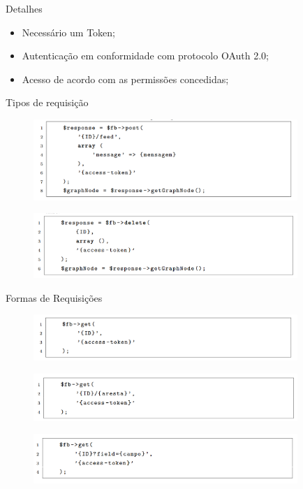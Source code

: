 \documentclass{aula-ifb}
\begin{document}
\begin{frame}{Detalhes}
\begin{itemize}
   \item Necessário um Token;
   \item Autenticação em conformidade com protocolo OAuth 2.0;
   \item Acesso de acordo com as permissões concedidas;
\end{itemize}
\end{frame}

\begin{frame}{Tipos de requisição}
\begin{figure}[h]
\includegraphics[width=10cm]{figuras/requisicaopost.png}
\label{fig:facebookgraph}
\end{figure}
\begin{figure}[h]
\includegraphics[width=10cm]{figuras/requisicaodelete.png}
\label{fig:facebookgraph}
\end{figure}
\end{frame}

\begin{frame}{Formas de Requisições}
\begin{figure}[h]
\includegraphics[width=10cm]{figuras/requisicaovertice.png}
\label{fig:facebookgraph}
\end{figure}

\begin{figure}[h]
\includegraphics[width=10cm]{figuras/requisicaoaresta.png}
\label{fig:facebookgraph}
\end{figure}

\begin{figure}[h]
\includegraphics[width=10cm]{figuras/requisicaocampo.png}
\label{fig:facebookgraph}
\end{figure}
\end{frame}
\end{document}
